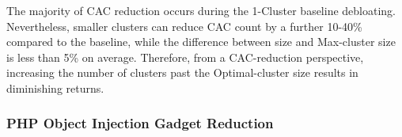 The majority of CAC reduction occurs during the 1-Cluster baseline debloating. 
Nevertheless, smaller clusters can reduce CAC count by a further 10-40\% compared to the baseline, while the difference between \sys{} size and Max-cluster size is less than 5\% on average.
Therefore, from a CAC-reduction perspective, increasing the number of clusters past the Optimal-cluster size results in diminishing returns.

\subsubsection{PHP Object Injection Gadget Reduction}

\begin{table}[]
    \centering
    \caption{Statistics on the contribution of cluster to individual code-coverage. 
    For files, third-party packages and first-party class modules, from the perspective of each individual user in the clusters, we show what percentage of those files or packages had new code-coverage by other users. Removed packages list the number of packages where a given percentage of their source code is removed by debloating.}
    \label{tab:augmented_coverage}
\end{table}
